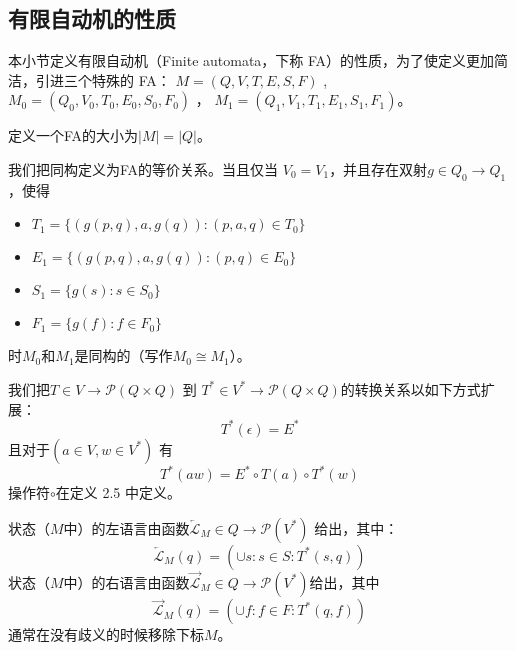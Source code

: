 \subsection{有限自动机的性质}

本小节定义有限自动机（Finite automata，下称 FA）的性质，为了使定义更加简洁，引进三个特殊的 FA： $M=(Q,V,T,E,S,F)$ , $M_0=(Q_0,V_0,T_0,E_0,S_0,F_0)$ ， $ M_1=(Q_1,V_1,T_1,E_1,S_1,F_1) $。

\begin{definition}[FA 的大小]
    定义一个FA的大小为$|M|=|Q|$。
\end{definition}

\begin{definition}\label{def:isom}
    我们把同构定义为FA的等价关系。当且仅当 $V_0=V_1$，并且存在双射$g\in Q_0 \longrightarrow Q_1$ ，使得
\begin{itemize}
    \item $T_1 = \{ (g(p,q),a,g(q)) : (p,a,q) \in T_0 \}$
    \item $E_1 = \{ (g(p,q),a,g(q)) : (p,q) \in E_0\}$
    \item $S_1 = \{ g(s):s\in S_0 \}$
    \item $F_1 = \{ g(f):f\in F_0 \}$
\end{itemize}
时$M_0$和$M_1$是同构的（写作$M_0 \cong M_1$）。
\end{definition}

\begin{definition}
    我们把$T \in V \longrightarrow \mathcal{P} (Q \times Q) $ 到 $ T^* \in V^* \longrightarrow \mathcal{P} (Q \times Q)  $的转换关系以如下方式扩展： 
    \[ 
        T^*(\epsilon) = E^* 
    \]
    且对于$(a\in V,w\in V^*)$ 有 
    \[ 
        T^*(aw) = E^* \circ T(a) \circ T^*(w)    
    \]
    操作符$\circ$在定义 2.5 中定义。
\end{definition}

\begin{definition}
    状态（$M$中）的左语言由函数$ \overleftarrow{\mathcal{L}} _M \in Q \longrightarrow \mathcal{P}(V^*)$ 给出，其中：
    \[ 
        \overleftarrow{\mathcal{L}}_M (q) = ( \cup s:s \in S : T^*(s,q) )  
    \] 
    状态（$M$中）的右语言由函数$ \overrightarrow{\mathcal{L}} _M \in Q \longrightarrow \mathcal{P}(V^*)$给出，其中 
    \[ 
        \overrightarrow{\mathcal{L}}_M (q) = ( \cup f:f \in F : T^*(q,f) ) 
    \] 
    通常在没有歧义的时候移除下标$M$。
\end{definition}

